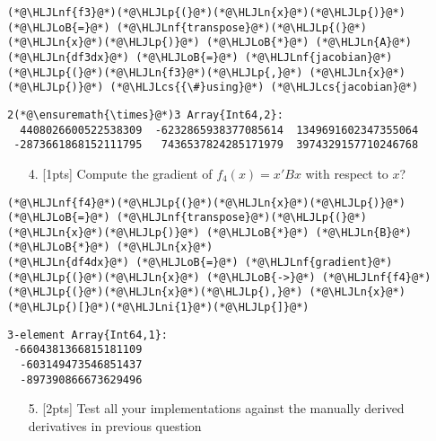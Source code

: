 \documentclass[12pt,a4paper]{article}
\newcommand{\HLJLn}[1]{#1}
\newcommand{\HLJLnf}[1]{\textcolor[RGB]{66,102,213}{#1}}
\newcommand{\HLJLni}[1]{\textcolor[RGB]{59,151,46}{#1}}
\newcommand{\HLJLoB}[1]{\textcolor[RGB]{102,102,102}{\textbf{#1}}}
\newcommand{\HLJLp}[1]{#1}
\newcommand{\HLJLcs}[1]{\textcolor[RGB]{153,153,119}{\textit{#1}}}
\begin{document}
\begin{lstlisting}
(*@\HLJLnf{f3}@*)(*@\HLJLp{(}@*)(*@\HLJLn{x}@*)(*@\HLJLp{)}@*) (*@\HLJLoB{=}@*) (*@\HLJLnf{transpose}@*)(*@\HLJLp{(}@*)(*@\HLJLn{x}@*)(*@\HLJLp{)}@*) (*@\HLJLoB{*}@*) (*@\HLJLn{A}@*)
(*@\HLJLn{df3dx}@*) (*@\HLJLoB{=}@*) (*@\HLJLnf{jacobian}@*)(*@\HLJLp{(}@*)(*@\HLJLn{f3}@*)(*@\HLJLp{,}@*) (*@\HLJLn{x}@*)(*@\HLJLp{)}@*) (*@\HLJLcs{{\#}using}@*) (*@\HLJLcs{jacobian}@*)
\end{lstlisting}

\begin{lstlisting}
2(*@\ensuremath{\times}@*)3 Array{Int64,2}:
  4408026600522538309  -6232865938377085614  1349691602347355064
 -2873661868152111795   7436537824285171979  3974329157710246768
\end{lstlisting}


\begin{itemize}
\item[4. ] [1pts] Compute the gradient of $f_4(x) = x'Bx$ with respect to $x$?

\end{itemize}

\begin{lstlisting}
(*@\HLJLnf{f4}@*)(*@\HLJLp{(}@*)(*@\HLJLn{x}@*)(*@\HLJLp{)}@*) (*@\HLJLoB{=}@*) (*@\HLJLnf{transpose}@*)(*@\HLJLp{(}@*)(*@\HLJLn{x}@*)(*@\HLJLp{)}@*) (*@\HLJLoB{*}@*) (*@\HLJLn{B}@*) (*@\HLJLoB{*}@*) (*@\HLJLn{x}@*)
(*@\HLJLn{df4dx}@*) (*@\HLJLoB{=}@*) (*@\HLJLnf{gradient}@*)(*@\HLJLp{(}@*)(*@\HLJLn{x}@*) (*@\HLJLoB{->}@*) (*@\HLJLnf{f4}@*)(*@\HLJLp{(}@*)(*@\HLJLn{x}@*)(*@\HLJLp{),}@*) (*@\HLJLn{x}@*)(*@\HLJLp{)[}@*)(*@\HLJLni{1}@*)(*@\HLJLp{]}@*)
\end{lstlisting}

\begin{lstlisting}
3-element Array{Int64,1}:
 -6604381366815181109
  -603149473546851437
  -897390866673629496
\end{lstlisting}


\begin{itemize}
\item[5. ] [2pts] Test all your implementations against the manually derived derivatives in previous question

\end{itemize}
\end{document}
